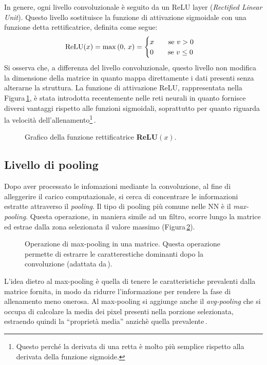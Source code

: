 In genere, ogni livello convoluzionale è seguito da un \acs{ReLU} layer (\textit{Rectified Linear Unit}). Questo livello sostituisce la funzione di attivazione sigmoidale con una funzione detta rettificatrice, definita come segue:
% 
\begin{gather*}
    \text{ReLU}(x) = \max{\left(0,\,x\right)} = 
    \begin{cases}
        x \hspace{20px} \text{se } v>0\\
        0 \hspace{20px} \text{se } v\leq0
    \end{cases}
\end{gather*}
% 
\noindent Si osserva che, a differenza del livello convoluzionale, questo livello non modifica la dimensione della matrice in quanto mappa direttamente i dati presenti senza alterarne la struttura. La funzione di attivazione \acs{ReLU}, rappresentata nella Figura\,\ref{fig:relu-function}, è stata introdotta recentemente nelle reti neurali in quanto fornisce diversi vantaggi rispetto alle funzioni sigmoidali, soprattutto per quanto riguarda la velocità dell'allenamento\footnote{Questo perché la derivata di una retta è molto più semplice rispetto alla derivata della funzione sigmoide.}\,\cite{aggarwal2018neural}.
% 
\begin{figure}[!t]
    \centering
    
    \caption[Grafico della funzione rettificatrice \textsl{ReLU}$(x)$.]{Grafico della funzione rettificatrice \textbf{ReLU}$(x)$.}\label{fig:relu-function}
\end{figure}

\subsection{Livello di pooling}

Dopo aver processato le infomazioni mediante la convoluzione, al fine di alleggerire il carico computazionale, si cerca di concentrare le informazioni estratte attraverso il \textit{pooling}. Il tipo di pooling più comune nelle \acs{NN} è il \textit{max-pooling}. Questa operazione, in maniera simile ad un filtro, scorre lungo la matrice ed estrae dalla zona selezionata il valore massimo (Figura\,\ref{fig:max-pooling-operation}).
% 
\begin{figure}[!b]
    \centering
    
    \caption[Operazione di max-pooling in una matrice.]{Operazione di max-pooling in una matrice. Questa operazione permette di estrarre le caratterestiche dominanti dopo la convoluzione (adattata da\,\cite{janosh_convolution}).}\label{fig:max-pooling-operation}
\end{figure}
% 
L'idea dietro al max-pooling è quella di tenere le caratteristiche prevalenti dalla matrice fornita, in modo da ridurre l'informazione per rendere la fase di allenamento meno onerosa. Al max-pooling si aggiunge anche il \textit{avg-pooling} che si occupa di calcolare la media dei pixel presenti nella porzione selezionata, estraendo quindi la ``proprietà media'' anzichè quella prevalente\,\cite{aggarwal2018neural, o2015introduction}.

